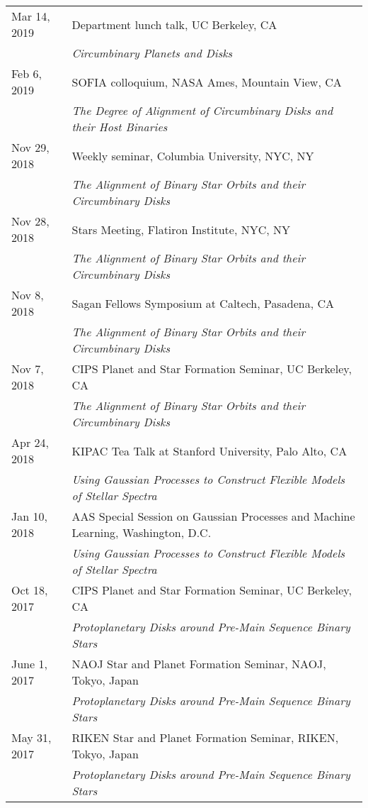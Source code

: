 \begin{longtable}{@{\hspace{10pt}}p{1.2in}l}
  Mar 14, 2019 & Department lunch talk, UC Berkeley, CA \\
  & \emph{Circumbinary Planets and Disks} \\[\rowskip]
  Feb 6, 2019 & SOFIA colloquium, NASA Ames, Mountain View, CA \\
  & \emph{The Degree of Alignment of Circumbinary Disks and their Host Binaries} \\[\rowskip]
  Nov 29, 2018 & Weekly seminar, Columbia University, NYC, NY \\
  & \emph{The Alignment of Binary Star Orbits and their Circumbinary Disks} \\[\rowskip]
  Nov 28, 2018 & Stars Meeting, Flatiron Institute, NYC, NY \\
  & \emph{The Alignment of Binary Star Orbits and their Circumbinary Disks} \\[\rowskip]
  Nov 8, 2018 & Sagan Fellows Symposium at Caltech, Pasadena, CA \\
  & \emph{The Alignment of Binary Star Orbits and their Circumbinary Disks} \\[\rowskip]
  Nov 7, 2018 & CIPS Planet and Star Formation Seminar, UC Berkeley, CA  \\
  & \emph{The Alignment of Binary Star Orbits and their Circumbinary Disks} \\[\rowskip]
  Apr 24, 2018 & KIPAC Tea Talk at Stanford University, Palo Alto, CA \\
  & \emph{Using Gaussian Processes to Construct Flexible Models of Stellar Spectra} \\[\rowskip]
  Jan 10, 2018 & AAS Special Session on Gaussian Processes and Machine Learning, Washington, D.C. \\
  & \emph{Using Gaussian Processes to Construct Flexible Models of Stellar Spectra}\\[\rowskip]
  Oct 18, 2017 & CIPS Planet and Star Formation Seminar, UC Berkeley, CA \\
  & \emph{Protoplanetary Disks around Pre-Main Sequence Binary Stars} \\[\rowskip]
  June 1, 2017 & NAOJ Star and Planet Formation Seminar, NAOJ, Tokyo, Japan \\
  & \emph{Protoplanetary Disks around Pre-Main Sequence Binary Stars} \\[\rowskip]
  May 31, 2017 & RIKEN Star and Planet Formation Seminar, RIKEN, Tokyo, Japan \\
  & \emph{Protoplanetary Disks around Pre-Main Sequence Binary Stars} \\[\rowskip]

\end{longtable}
